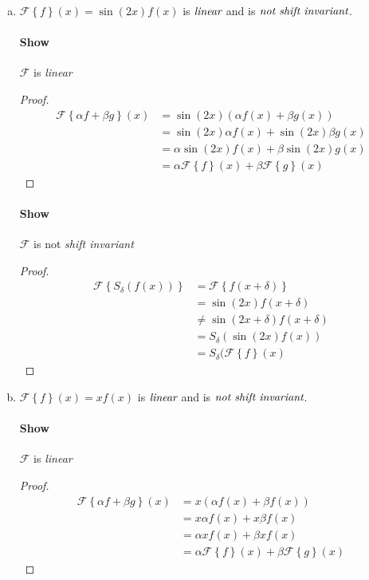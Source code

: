 \documentclass{paper}
\begin{document}
\begin{enumerate}[(a)]
\item $\mathcal{F} \left \{ f \right\} (x) = \sin(2x)f(x)$ is $\emph{linear}$ and is $\emph{not shift invariant}$.

\paragraph{Show} $\mathcal{F}$ is \emph{linear} \\
\begin{proof}
\begin{align*}
    \mathcal{F} \left \{\alpha f + \beta g \right\}(x)
    &= \sin(2x)\left( \alpha f(x) + \beta g(x) \right) \\
    &= \sin(2x) \alpha f(x) + \sin(2x) \beta g(x) \\
    &= \alpha \sin(2x) f(x) + \beta \sin(2x) g(x) \\
    &= \alpha \mathcal{F} \left \{f\right\}(x) + \beta \mathcal{F} \left \{g \right\}(x)
\end{align*}
\end{proof}

\paragraph{Show} $\mathcal{F}$ is not \emph{shift invariant} \\
\begin{proof}
\begin{align*}
    \mathcal{F} \left \{S_\delta (f(x)) \right\} 
    &= \mathcal{F} \left\{ f(x+\delta) \right\} \\
    &= \sin(2x)f(x + \delta) \\
    &\neq \sin(2x+\delta)f(x + \delta) \\
    &= S_{\delta} (\sin(2x)f(x)) \\
    &= S_\delta(\mathcal{F}\left \{f \right\}(x)
\end{align*}
\end{proof}


\item $\mathcal{F} \left \{ f \right\} (x) = x f(x)$ is $\emph{linear}$ and is $\emph{not shift invariant}$.

\paragraph{Show} $\mathcal{F}$ is \emph{linear} \\
\begin{proof}
\begin{align*}
    \mathcal{F} \left \{\alpha f + \beta g \right\}(x)
    &= x(\alpha f(x) + \beta f(x)) \\
    &= x \alpha f(x) + x \beta f(x) \\
    &= \alpha x f(x) + \beta x f(x) \\ 
    &= \alpha \mathcal{F} \left \{f\right\}(x) + \beta \mathcal{F} \left \{g \right\}(x)
\end{align*}
\end{proof}


\end{enumerate}
\end{document}
